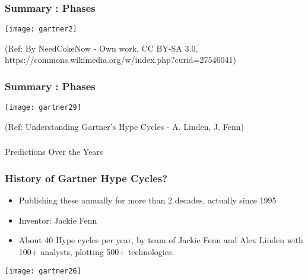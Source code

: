 \begin{frame}[fragile]\frametitle{Summary : Phases}

\begin{center}
\texttt{[image: gartner2]}
\end{center}

{\tiny (Ref: By NeedCokeNow - Own work, CC BY-SA 3.0, https://commons.wikimedia.org/w/index.php?curid=27546041)}
\end{frame}

\begin{frame}[fragile]\frametitle{Summary : Phases}

\begin{center}
\texttt{[image: gartner29]}
\end{center}

{\tiny (Ref: Understanding Gartner's Hype Cycles - A. Linden, J. Fenn)}
\end{frame}


\begin{frame}[fragile]\frametitle{}
\begin{center}
{\Large Predictions Over the Years}
\end{center}
\end{frame}

\begin{frame}[fragile]\frametitle{History of Gartner Hype Cycles?}

\begin{itemize}
\item Publishing these annually for more than 2 decades, actually since 1995
\item Inventor: Jackie Fenn
\item About 40 Hype cycles per year, by team of Jackie Fenn and Alex Linden with 100+ analysts, plotting 500+ technologies.
\end{itemize}

\begin{center}
\texttt{[image: gartner26]}
\end{center}

\end{frame}


